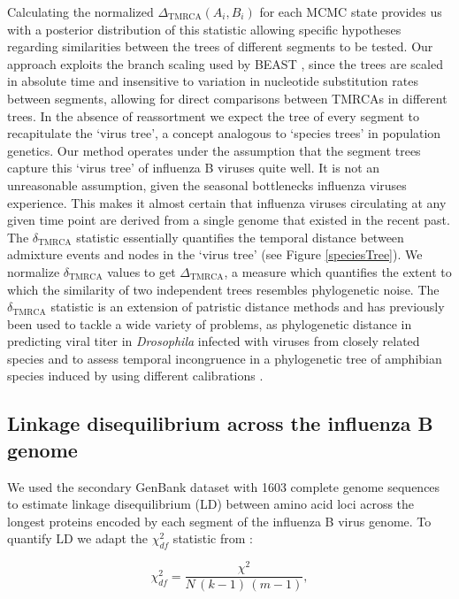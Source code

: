 \documentclass[11pt,oneside,letterpaper]{article}
\newcommand{\chiSq}{\chi^{2}_{df}}
\newcommand{\dtmrca}{\Delta_\mathrm{TMRCA}}
\newcommand{\undtmrca}{\delta_\mathrm{TMRCA}}
\begin{document}
Calculating the normalized $\dtmrca(A_i, B_i)$ for each MCMC state provides us with a posterior distribution of this statistic allowing  specific hypotheses regarding similarities between the trees of different segments to be tested.
Our approach exploits the branch scaling used by BEAST \citep{drummond2012}, since the trees are scaled in absolute time and insensitive to variation in nucleotide substitution rates between segments, allowing for direct comparisons between TMRCAs in different trees.
In the absence of reassortment we expect the tree of every segment to recapitulate the `virus tree', a concept analogous to `species trees' in population genetics.
Our method operates under the assumption that the segment trees capture this `virus tree' of influenza B viruses quite well.
It is not an unreasonable assumption, given the seasonal bottlenecks influenza viruses experience.
This makes it almost certain that influenza viruses circulating at any given time point are derived from a single genome that existed in the recent past.
The $\undtmrca$ statistic essentially quantifies the temporal distance between admixture events and nodes in the `virus tree' (see Figure \ref{speciesTree}).
We normalize $\undtmrca$ values to get $\dtmrca$, a measure which quantifies the extent to which the similarity of two independent trees resembles phylogenetic noise.
The $\undtmrca$ statistic is an extension of patristic distance methods and has previously been used to tackle a wide variety of problems, as phylogenetic distance in predicting viral titer in \textit{Drosophila} infected with viruses from closely related species \citep{longdon2011} and to assess temporal incongruence in a phylogenetic tree of amphibian species induced by using different calibrations \citep{ruane2011}.

\subsection*{Linkage disequilibrium across the influenza B genome}
We used the secondary GenBank dataset with 1603 complete genome sequences to estimate linkage disequilibrium (LD) between amino acid loci across the longest proteins encoded by each segment of the influenza B virus genome.
To quantify LD we adapt the $\chiSq$ statistic from \citep{hedrick1986}:

\begin{equation}
\chiSq=\frac{\chi^{2}}{N\,(k-1)\,(m-1)},
\end{equation}
\end{document}
